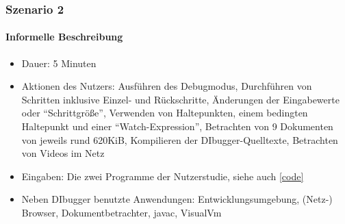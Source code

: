 \documentclass[parskip=full]{scrartcl}
\begin{document}
    \subsubsection{Szenario 2}
        \paragraph{Informelle Beschreibung}
        \begin{itemize}
            \item{Dauer:} 5 Minuten 
            \item{Aktionen des Nutzers:} Ausführen des Debugmodus, Durchführen von Schritten inklusive Einzel- und Rückschritte, Änderungen der Eingabewerte oder \enquote{Schrittgröße}, Verwenden von Haltepunkten, einem bedingten Haltepunkt und einer \enquote{Watch-Expression}, Betrachten von 9 Dokumenten von jeweils rund 620KiB, Kompilieren der DIbugger-Quelltexte, Betrachten von Videos im Netz
            \item{Eingaben:} Die zwei Programme der Nutzerstudie, siehe auch \ref{code}
            \item{Neben DIbugger benutzte Anwendungen:} Entwicklungsumgebung, (Netz-) Browser, Dokumentbetrachter, javac, VisualVm  
        \end{itemize}
\end{document}
